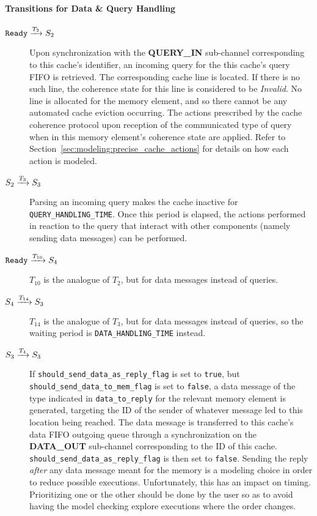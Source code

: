 \paragraph{Transitions for Data \& Query Handling}
\begin{description}
\item[$\texttt{Ready} \xrightarrow[]{T_{2}} S_2$]
   Upon synchronization with the \textbf{QUERY\_IN} sub-channel corresponding
   to this cache's identifier, an incoming query for the this cache's query FIFO
   is retrieved. The corresponding cache line is located. If there is no such
   line, the coherence state for this line is considered to be \textit{Invalid}.
   No line is allocated for the memory element, and so there cannot be any
   automated cache eviction occurring. The actions prescribed by the cache
   coherence protocol upon reception of the communicated type of query when in
   this memory element's coherence state are applied. Refer to
   Section~\ref{sec:modeling:precise_cache_actions} for details on how each
   action is modeled.

\item[$S_2 \xrightarrow[]{T_{3}} S_3$]
   Parsing an incoming query makes the cache inactive for
   \lstinline!QUERY_HANDLING_TIME!. Once this period is elapsed, the actions
   performed in reaction to the query that interact with other components
   (namely sending data messages) can be performed.

\item[$\texttt{Ready} \xrightarrow[]{T_{10}} S_4$]
   $T_{10}$ is the analogue of $T_{2}$, but for data messages instead of
   queries.

\item[$S_4 \xrightarrow[]{T_{14}} S_3$]
   $T_{14}$ is the analogue of $T_{3}$, but for data messages instead of
   queries, so the waiting period is \lstinline!DATA_HANDLING_TIME! instead.

\item[$S_3 \xrightarrow[]{T_{4}} S_3$]
   If \lstinline!should_send_data_as_reply_flag! is set to \texttt{true}, but
   \lstinline!should_send_data_to_mem_flag! is set to \texttt{false}, a data
   message of the type indicated in \lstinline!data_to_reply! for the relevant
   memory element is generated, targeting the ID of the sender of whatever
   message led to this location being reached. The data message is transferred
   to this cache's data FIFO outgoing queue through a synchronization on the
   \textbf{DATA\_OUT} sub-channel corresponding to the ID of this cache.
   \lstinline!should_send_data_as_reply_flag! is then set to \texttt{false}.
   Sending the reply \textit{after} any data message meant for the memory is a
   modeling choice in order to reduce possible executions. Unfortunately, this
   has an impact on timing. Prioritizing one or the other should be done by the
   user so as to avoid having the model checking explore executions where the
   order changes.


\end{description}
